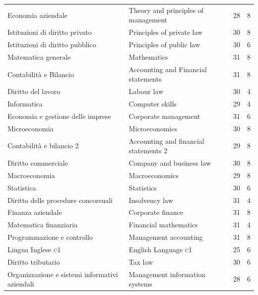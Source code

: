 \begin{center}

\tabletail{%
}
\tablelasttail{}	

 \begin{supertabular}{p{4.9cm} p{4.9cm} c c}
Economia aziendale&Theory and principles of management& 28 & 8\\
Istituzioni di diritto privato&Principles of private law&30&8\\
 Istituzioni di diritto pubblico 
&
 Principles of public law 
& 30&
 6 
\\
Matematica generale 
& Mathematics 
&31&8\\
 Contabilit\`a e Bilancio 
& Accounting and Financial statements 
& 31 & 8\\
 Diritto del lavoro 
&
 Labour law 
& 30&
4 
\\
 Informatica & Computer skills &29& 4 
\\
 Economia e gestione delle imprese & Corporate management &31&6 
\\
 Microeconomia & Microeconomics &30&8 
\\
 Contabilit\`a e bilancio 2 & Accounting and financial statements 2 
&29&8 \\
 Diritto commerciale & Company and business law &30&8 
\\
 Macroeconomia & Macroeconomics &29&8 
\\
 Statistica & Statistics &30&6\\
 Diritto delle procedure concorsuali & Insolvency law &31&4 
\\
 Finanza aziendale 
& Corporate finance 
&31 &8 \\
 Matematica finanziaria & Financial mathematics &31&4 
\\
 Programmazione e controllo 
& Management accounting &31&8 
\\
Lingua Inglese \textsc{c1}& English Language \textsc{c1}& 25&6\\ 
Diritto tributario & Tax law &30&6 
\\
Organizzazione e sistemi informativi aziendali &Management information systems &28&6 
\\

\end{supertabular}
\end{center}
